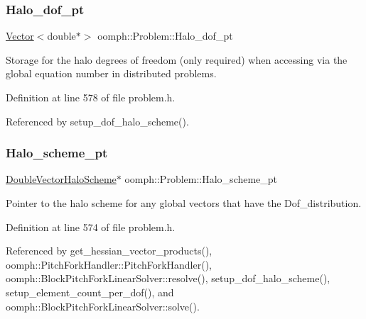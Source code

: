 \mbox{\label{classoomph_1_1Problem_ac59d9163cc5d008a2ade4de8da06dbf6}} 
\subsubsection{\texorpdfstring{Halo\+\_\+dof\+\_\+pt}{Halo\_dof\_pt}}
{\footnotesize\ttfamily \hyperlink{classoomph_1_1Vector}{Vector}$<$double$\ast$$>$ oomph\+::\+Problem\+::\+Halo\+\_\+dof\+\_\+pt\hspace{0.3cm}{\ttfamily [protected]}}



Storage for the halo degrees of freedom (only required) when accessing via the global equation number in distributed problems. 



Definition at line 578 of file problem.\+h.



Referenced by setup\+\_\+dof\+\_\+halo\+\_\+scheme().

\mbox{\label{classoomph_1_1Problem_a1dcaa04975d69c616ab294cbfaf53d55}} 
\subsubsection{\texorpdfstring{Halo\+\_\+scheme\+\_\+pt}{Halo\_scheme\_pt}}
{\footnotesize\ttfamily \hyperlink{classoomph_1_1DoubleVectorHaloScheme}{Double\+Vector\+Halo\+Scheme}$\ast$ oomph\+::\+Problem\+::\+Halo\+\_\+scheme\+\_\+pt\hspace{0.3cm}{\ttfamily [protected]}}



Pointer to the halo scheme for any global vectors that have the Dof\+\_\+distribution. 



Definition at line 574 of file problem.\+h.



Referenced by get\+\_\+hessian\+\_\+vector\+\_\+products(), oomph\+::\+Pitch\+Fork\+Handler\+::\+Pitch\+Fork\+Handler(), oomph\+::\+Block\+Pitch\+Fork\+Linear\+Solver\+::resolve(), setup\+\_\+dof\+\_\+halo\+\_\+scheme(), setup\+\_\+element\+\_\+count\+\_\+per\+\_\+dof(), and oomph\+::\+Block\+Pitch\+Fork\+Linear\+Solver\+::solve().

